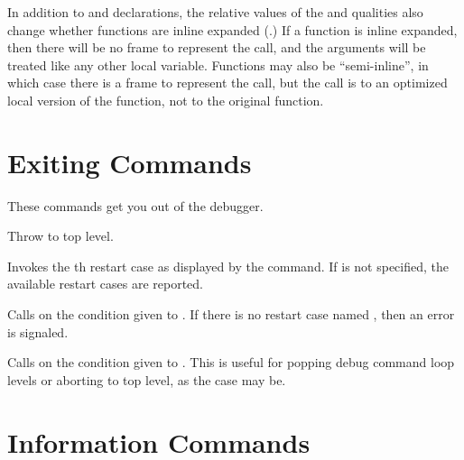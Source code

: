 In addition to  and  declarations, the relative values
of the  and  qualities also change whether functions are
inline expanded (.)  If a function is inline
expanded, then there will be no frame to represent the call, and the arguments
will be treated like any other local variable.  Functions may also be
``semi-inline'', in which case there is a frame to represent the call, but the
call is to an optimized local version of the function, not to the original
function.


\section{Exiting Commands}

These commands get you out of the debugger.

\begin{Lentry}

\item[\code{quit}]
Throw to top level.

\item[\code{restart} \mopt{\var{n}}]%
Invokes the th restart case as displayed by the 
command.  If  is not specified, the available restart cases are
reported.

\item[\code{go}]
Calls  on the condition given to .  If there is no
restart case named , then an error is signaled.

\item[\code{abort}]
Calls  on the condition given to .  This is
useful for popping debug command loop levels or aborting to top level,
as the case may be.

% 
\end{Lentry}


\section{Information Commands}

